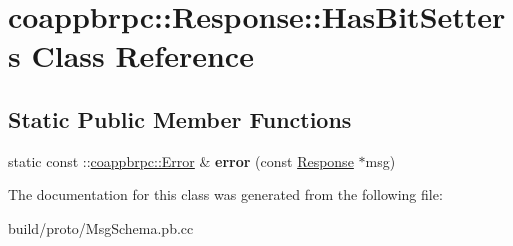 \hypertarget{classcoappbrpc_1_1Response_1_1HasBitSetters}{}\section{coappbrpc\+:\+:Response\+:\+:Has\+Bit\+Setters Class Reference}
\label{classcoappbrpc_1_1Response_1_1HasBitSetters}
\subsection*{Static Public Member Functions}
\begin{DoxyCompactItemize}
\item 
\mbox{\label{classcoappbrpc_1_1Response_1_1HasBitSetters_afe7b2e5cad486fab4e12b8f92d20a5af}} 
static const \+::\hyperlink{classcoappbrpc_1_1Error}{coappbrpc\+::\+Error} \& {\bfseries error} (const \hyperlink{classcoappbrpc_1_1Response}{Response} $\ast$msg)
\end{DoxyCompactItemize}


The documentation for this class was generated from the following file\+:\begin{DoxyCompactItemize}
\item 
build/proto/Msg\+Schema.\+pb.\+cc\end{DoxyCompactItemize}
